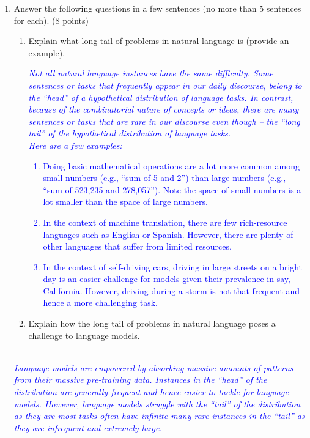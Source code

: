 \documentclass[12pt]{article}
\newcommand{\solution}[2]{\\[2mm] \textcolor{blue}{\em #1}} %
\begin{document}
\begin{enumerate}
\begin{enumerate}
\end{enumerate}

\item Answer the following questions in a few sentences (no more than 5 sentences for each). (8 points)
\begin{enumerate}
    \item Explain what long tail of problems in natural language is (provide an example). 
\solution{
Not all natural language  instances have the same difficulty.
Some sentences or tasks that frequently appear in our daily discourse, belong to the ``head'' of a hypothetical distribution of language tasks. 
In contrast, because of the combinatorial nature of concepts or ideas, there are \emph{many} sentences or tasks that are rare in our discourse even though -- the ``long tail'' of the hypothetical distribution of language tasks. \\ 
Here are a few examples: 
\begin{enumerate}
    \item Doing basic mathematical operations are a lot more common among small numbers (e.g., ``sum of 5 and 2'') than large numbers (e.g., ``sum of 523,235 and 278,057''). Note the space of small numbers is a lot smaller than the space of large numbers. 
    \item In the context of machine translation, there are few rich-resource languages such as English or Spanish. However, there are plenty of other languages that suffer from limited resources. 
    \item In the context of self-driving cars, driving in large streets on a bright day is an easier challenge for models given their prevalence in say, California. However, driving  during a storm is not that frequent and hence a more challenging task.
\end{enumerate}
}{\vspace{8cm}}
    \item Explain how the long tail of problems in natural language poses a challenge to  language models. 
\end{enumerate}
\solution{
    Language models are empowered by absorbing 
    massive amounts of patterns from their massive pre-training data.
    Instances in the ``head'' of the distribution are generally frequent and hence easier to tackle for language models. 
    However, language models struggle with the ``tail'' of the distribution as  they are most tasks often have infinite many rare instances in the ``tail'' as they are infrequent and extremely large. 
}{\vspace{4cm}}
\end{enumerate}
\end{document}
